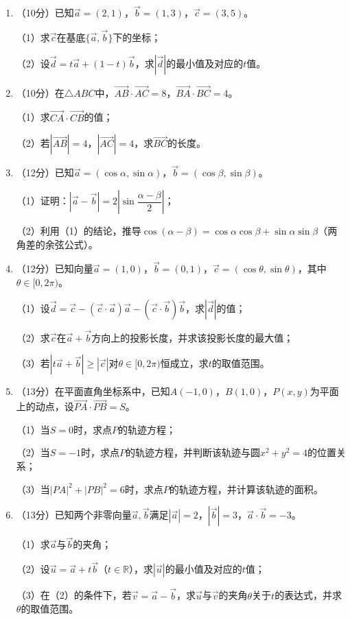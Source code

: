 \documentclass[12pt, a4paper]{ctexart}
\begin{document}
\begin{enumerate}[start=17]
\item （10分）已知$\vec{a}=(2,1)$，$\vec{b}=(1,3)$，$\vec{c}=(3,5)$。

（1）求$\vec{c}$在基底$\{\vec{a},\vec{b}\}$下的坐标；

（2）设$\vec{d}=t\vec{a}+(1-t)\vec{b}$，求$|\vec{d}|$的最小值及对应的$t$值。

\item （10分）在$\triangle ABC$中，$\overrightarrow{AB}\cdot\overrightarrow{AC}=8$，$\overrightarrow{BA}\cdot\overrightarrow{BC}=4$。

（1）求$\overrightarrow{CA}\cdot\overrightarrow{CB}$的值；

（2）若$|\overrightarrow{AB}|=4$，$|\overrightarrow{AC}|=4$，求$\overrightarrow{BC}$的长度。

\item （12分）已知$\vec{a}=(\cos\alpha,\sin\alpha)$，$\vec{b}=(\cos\beta,\sin\beta)$。

（1）证明：$|\vec{a}-\vec{b}|=2\left|\sin\dfrac{\alpha-\beta}{2}\right|$；

（2）利用（1）的结论，推导$\cos(\alpha-\beta)=\cos\alpha\cos\beta+\sin\alpha\sin\beta$（两角差的余弦公式）。

\item （12分）已知向量$\vec{a}=(1,0)$，$\vec{b}=(0,1)$，$\vec{c}=(\cos\theta,\sin\theta)$，其中$\theta\in[0,2\pi)$。

（1）设$\vec{d}=\vec{c}-(\vec{c}\cdot\vec{a})\vec{a}-(\vec{c}\cdot\vec{b})\vec{b}$，求$|\vec{d}|$的值；

（2）求$\vec{c}$在$\vec{a}+\vec{b}$方向上的投影长度，并求该投影长度的最大值；

（3）若$|t\vec{a}+\vec{b}|\geq|\vec{c}|$对$\theta\in[0,2\pi)$恒成立，求$t$的取值范围。

\item （13分）在平面直角坐标系中，已知$A(-1,0)$，$B(1,0)$，$P(x,y)$为平面上的动点，设$\overrightarrow{PA}\cdot\overrightarrow{PB}=S$。

（1）当$S=0$时，求点$P$的轨迹方程；

（2）当$S=-1$时，求点$P$的轨迹方程，并判断该轨迹与圆$x^2+y^2=4$的位置关系；

（3）当$|PA|^2+|PB|^2=6$时，求点$P$的轨迹方程，并计算该轨迹的面积。

\item （13分）已知两个非零向量$\vec{a},\vec{b}$满足$|\vec{a}|=2$，$|\vec{b}|=3$，$\vec{a}\cdot\vec{b}=-3$。

（1）求$\vec{a}$与$\vec{b}$的夹角；

（2）设$\vec{u}=\vec{a}+t\vec{b}$（$t\in\mathbb{R}$），求$|\vec{u}|$的最小值及对应的$t$值；

（3）在（2）的条件下，若$\vec{v}=\vec{a}-\vec{b}$，求$\vec{u}$与$\vec{v}$的夹角$\theta$关于$t$的表达式，并求$\theta$的取值范围。
\end{enumerate}
\end{document}
